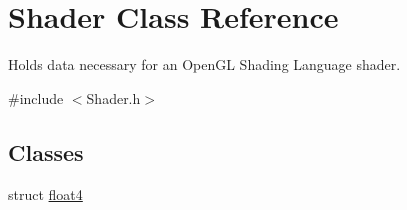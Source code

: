 \hypertarget{class_shader}{\section{Shader Class Reference}
\label{class_shader}
}


Holds data necessary for an Open\-G\-L Shading Language shader.  




{\ttfamily \#include $<$Shader.\-h$>$}

\subsection*{Classes}
\begin{DoxyCompactItemize}
\item 
struct \hyperlink{struct_shader_1_1float4}{float4}
\end{DoxyCompactItemize}
